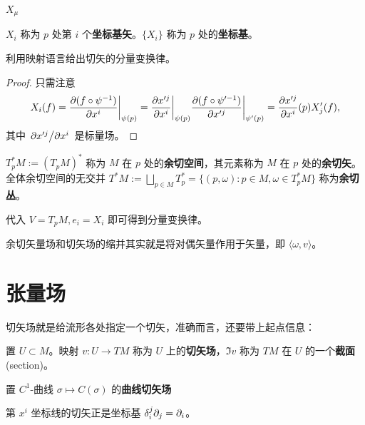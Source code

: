 $X_\mu$

\begin{definition}
    $X_i$ 称为 $p$ 处第 $i$ 个\textbf{坐标基矢}。$\{X_i\}$ 称为 $p$ 处的\textbf{坐标基}。
\end{definition}

\begin{theorem}
    利用映射语言给出切矢的分量变换律。
\end{theorem}
\begin{proof}只需注意
    \[
    X_i(f)=\pdv{(f\circ\psi^{-1})}{x^i}\bigg|_{\psi(p)}=\pdv{x'^j}{x^i}\bigg|_{\psi(p)}\pdv{(f\circ\psi'^{-1})}{x'^j}\bigg|_{\psi'(p)}={\pdv{x'^j}{x^i}}(p)X'_j(f),
    \]
其中 $\pdv*{x'^j}{x^i}$ 是标量场。
\end{proof}

\begin{definition}
    $T^*_p M:=(T_p M)^*$ 称为 $M$ 在 $p$ 处的\textbf{余切空间}，其元素称为 $M$ 在 $p$ 处的\textbf{余切矢}。
    全体余切空间的无交并 $T^*M:=\bigsqcup_{p\in M} T^*_p=\{(p,\omega):p\in M,\omega\in T^*_p M\}$ 称为\textbf{余切丛}。
\end{definition}

代入 $V=T_p M,e_i=X_i$ 即可得到分量变换律。

余切矢量场和切矢场的缩并其实就是将对偶矢量作用于矢量，即
$\langle \omega, v\rangle$。

\section{张量场}

切矢场就是给流形各处指定一个切矢，准确而言，还要带上起点信息：
\begin{definition}
    置 $U\subset M$。映射 $v:U\to TM$ 称为 $U$  上的\textbf{切矢场}，$\Im v$ 称为 $TM$ 在 $U$ 的一个\textbf{截面}(section)。
\end{definition}

\begin{definition}
    置 $C^1$-曲线 $\sigma\mapsto C(\sigma)$ 的\textbf{曲线切矢场}
\end{definition}

\begin{eg}
    第 $x^i$ 坐标线的切矢正是坐标基 $\delta^j_i\partial_j=\partial_i$。
\end{eg}

